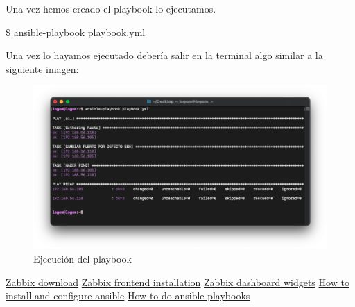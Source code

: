 Una vez hemos creado el playbook lo ejecutamos.
    \begin{tcolorbox}[colback=black!10, halign=left]
        \$ ansible-playbook playbook.yml
    \end{tcolorbox}

Una vez lo hayamos ejecutado debería salir en la terminal algo similar a la siguiente imagen:
    \begin{figure}[H]
        \centering
        \includegraphics[scale=0.45]{images/ejecucion_playbook.png}
        \caption{Ejecución del playbook}
        \label{fig:ejecucion_playbook}
    \end{figure}

\begin{thebibliography}{0}
    \bibitem{} \href{https://www.zabbix.com/download?}{Zabbix download}
    \bibitem{} \href{https://www.zabbix.com/documentation/5.0/manual/installation/frontend}{Zabbix frontend installation}
    \bibitem{} \href{https://www.zabbix.com/documentation/5.4/en/manual/web_interface/frontend_sections/monitoring/dashboard/widgets}{Zabbix dashboard widgets}
    \bibitem{} \href{https://www.digitalocean.com/community/tutorials/how-to-install-and-configure-ansible-on-ubuntu-20-04-es}{How to install and configure ansible}
    \bibitem{} \href{https://www.youtube.com/watch?v=Wuv0ZPOMLf0}{How to do ansible playbooks}
\end{thebibliography}


